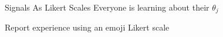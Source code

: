 \documentclass[
  ignorenonframetext,
]{beamer}
\begin{document}
\begin{frame}{Signals As Likert Scales}
\protect\hypertarget{signals-as-likert-scales}{}
Everyone is learning about their \(\theta_j\)

Report experience using an emoji Likert scale

\begin{figure}

\begin{minipage}[t]{0.14\linewidth}

{\centering 


}

\end{minipage}%
%
\begin{minipage}[t]{0.14\linewidth}

{\centering 


}

\end{minipage}%
%
\begin{minipage}[t]{0.14\linewidth}

{\centering 

}
\end{minipage}
\end{figure}
\end{frame}
\end{document}
